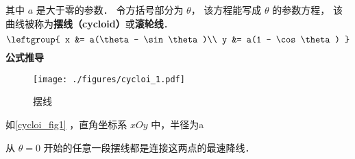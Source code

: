 
\begin{issues}
\issueDraft
\end{issues}

其中 $a$ 是大于零的参数． 令方括号部分为 $\theta$， 该方程能写成 $\theta$ 的参数方程， 该曲线被称为\textbf{摆线（cycloid）}或\textbf{滚轮线}． %
\begin{equation}
\leftgroup{
x &= a(\theta - \sin\theta)\\
y &= a(1 - \cos\theta)
}\end{equation}
\textbf{公式推导}
\begin{figure}[ht]
\centering
\texttt{[image: ./figures/cycloi\_1.pdf]}
\caption{摆线} \label{cycloi_fig1}
\end{figure}
如\autoref{cycloi_fig1} ，直角坐标系 $xOy$ 中，半径为a


从 $\theta = 0$ 开始的任意一段摆线都是连接这两点的最速降线． 
